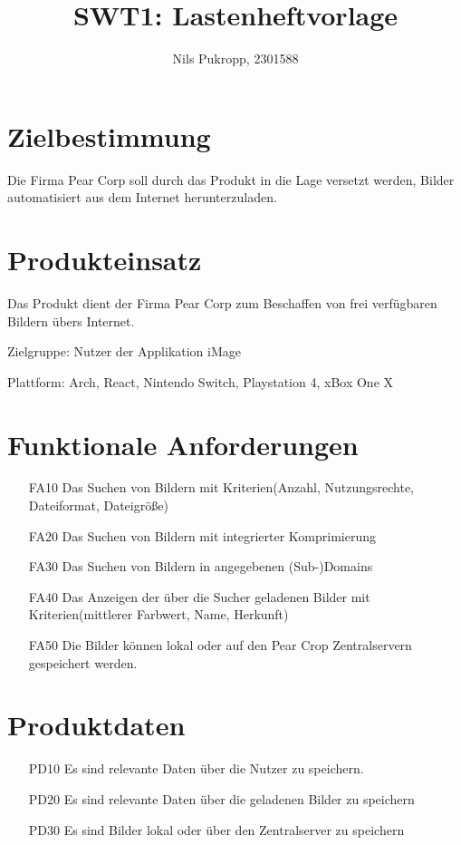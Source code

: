 \documentclass[parskip=full]{scrartcl}
\title{SWT1: Lastenheftvorlage}
\author{Nils Pukropp, 2301588}
\begin{document}
\maketitle

%
%
\section{Zielbestimmung}
Die Firma Pear Corp soll durch das Produkt in die Lage versetzt werden, Bilder automatisiert aus dem Internet herunterzuladen.

\section{Produkteinsatz}
Das Produkt dient der Firma Pear Corp zum Beschaffen von frei verfügbaren Bildern übers Internet.

Zielgruppe: Nutzer der \gls{Applikation} \gls{iMage}

Plattform: Arch, React, Nintendo Switch, Playstation 4, xBox One X

\section{Funktionale Anforderungen}
\begin{itemize}[nosep]
\item[FA10] Das Suchen von Bildern mit Kriterien(Anzahl, Nutzungsrechte, Dateiformat, Dateigröße)
\item[FA20] Das Suchen von Bildern mit integrierter \gls{Komprimierung}
\item[FA30] Das Suchen von Bildern in angegebenen (Sub-)\glspl{Domain}
\item[FA40] Das Anzeigen der über die Sucher geladenen Bilder mit Kriterien(mittlerer Farbwert, Name, Herkunft)
\item[FA50] Die Bilder können lokal oder auf den Pear Crop Zentralservern gespeichert werden.
\end{itemize}

\section{Produktdaten}
\begin{itemize}[nosep]
\item[PD10] Es sind relevante Daten über die Nutzer zu speichern.
\item[PD20] Es sind relevante Daten über die geladenen Bilder zu speichern
\item[PD30] Es sind Bilder lokal oder über den Zentralserver zu speichern
\end{itemize}
\end{document}
